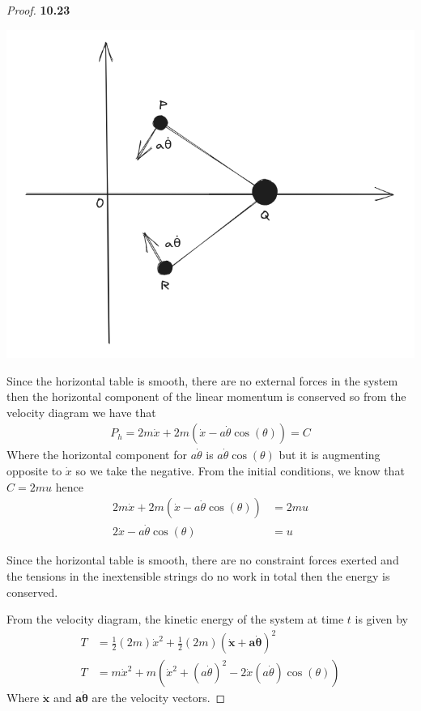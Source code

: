 \documentclass[11pt]{article}
\theoremstyle{definition}
\begin{document}
\begin{proof}{\textbf{10.23}}
\begin{center}
        \includegraphics[scale=0.3]{ch10-23-2.png}
    \end{center}
    Since the horizontal table is smooth, there are no external forces in
    the system then the horizontal component of the linear momentum is
    conserved so from the velocity diagram we have that
    \begin{align*}
        P_h = 2m\dot{x} + 2m(\dot{x} - a\dot{\theta}\cos(\theta)) = C
    \end{align*}
    Where the horizontal component for $a\dot{\theta}$ is
    $a\dot\theta\cos(\theta)$ but it is augmenting opposite to $\dot x$ so
    we take the negative.
    From the initial conditions, we know that $C = 2mu$ hence
    \begin{align*}
        2m\dot{x} + 2m(\dot{x} - a\dot{\theta}\cos(\theta)) &= 2mu\\
        2\dot{x} - a\dot{\theta}\cos(\theta) &= u
    \end{align*}

    Since the horizontal table is smooth, there are no constraint forces
    exerted and the tensions in the inextensible strings do no work in total
    then the energy is conserved.
    
    From the velocity diagram, the kinetic energy of the system at
    time $t$ is given by
    \begin{align*}
        T &= \frac{1}{2}(2m)\dot x^2 +
        \frac{1}{2}(2m)(\bm{\dot x} + \bm{a \dot\theta})^2\\
        T &= m\dot x^2 +
        m(\dot x^2 + (a\dot\theta)^2 - 2 \dot x (a\dot\theta) \cos(\theta))
    \end{align*}
    Where $\bm{\dot x}$ and $\bm{a \dot\theta}$ are the velocity vectors.


\end{proof}
\end{document}
